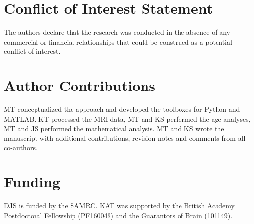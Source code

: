 \documentclass[utf8]{frontiersSCNS} %
\newcommand{\todo}[1]{\textcolor{Magenta}{todo: #1}}
\renewcommand{\b}{\boldsymbol{\beta}} %
\renewcommand{\H}{\mathbf{H}}
\newcommand{\I}{\mathbf{I}}
\newcommand{\X}{\mathbf{X}}
\newcommand{\y}{\mathbf{y}}
\newcommand{\yh}{\mathbf{\hat{y}}}
\newcommand{\z}{\mathbf{z}}
\begin{document}



\section*{Conflict of Interest Statement}

The authors declare that the research was conducted in the absence of any commercial or financial relationships that could be construed as a potential conflict of interest.

\section*{Author Contributions}

MT conceptualized the approach and developed the toolboxes for Python and MATLAB. KT processed the MRI data, MT and KS performed the age analyses, MT and JS performed the mathematical analysis. MT and KS wrote the manuscript with additional contributions, revision notes and comments from all co-authors.

\section*{Funding}
DJS is funded by the SAMRC. KAT was supported by the British Academy Postdoctoral Fellowship (PF160048) and the Guarantors of Brain (101149).
\end{document}
